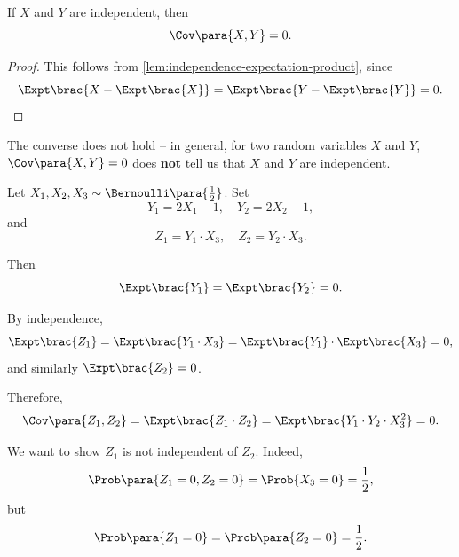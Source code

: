 \begin{proposition}
    If \(X\) and \(Y\) are independent, then
    \[
        \Cov\para{X, Y} = 0.
    \]
\end{proposition}

\begin{proof}
    This follows from \autoref{lem:independence-expectation-product}, since
    \[
        \Expt\brac{X - \Expt\brac{X}} = \Expt\brac{Y - \Expt\brac{Y}} = 0.
    \]
\end{proof}

The converse does not hold -- in general, for two random variables \(X\) and \(Y\), \(\Cov\para{X, Y} = 0\) does \textbf{not} tell us that \(X\) and \(Y\) are independent.

\begin{example}
    \label{ex:zero-variance-no-independent}%
    Let \(X_1, X_2, X_3 \sim \Bernoulli\para{\frac{1}{2}}\). Set
    \[
        Y_1 = 2 X_1 - 1, \quad Y_2 = 2 X_2 - 1,
    \]
    and
    \[
        Z_1 = Y_1 \cdot X_3, \quad Z_2 = Y_2 \cdot X_3.
    \]

    Then
    \[
        \Expt\brac{Y_1} = \Expt\brac{Y_2} = 0.
    \]

    By independence,
    \[
        \Expt\brac{Z_1} = \Expt\brac{Y_1 \cdot X_3} = \Expt\brac{Y_1} \cdot \Expt\brac{X_3} = 0,
    \]
    and similarly \(\Expt\brac{Z_2} = 0\).

    Therefore,
    \[
        \Cov\para{Z_1, Z_2} = \Expt\brac{Z_1 \cdot Z_2} = \Expt\brac{Y_1 \cdot Y_2 \cdot X_3^2} = 0.
    \]

    We want to show \(Z_1\) is not independent of \(Z_2\). Indeed,
    \[
        \Prob\para{Z_1 = 0, Z_2 = 0} = \Prob{X_3 = 0} = \frac{1}{2},
    \]
    but
    \[
        \Prob\para{Z_1 = 0} = \Prob\para{Z_2 = 0} = \frac{1}{2}.
    \]
\end{example}